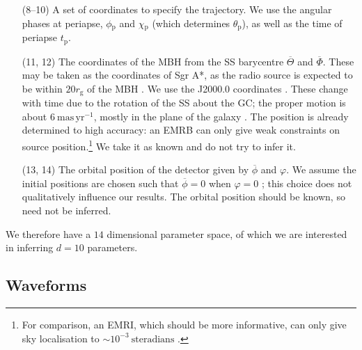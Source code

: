 \documentclass[useAMS,usedcolumn,usegraphicx,usenatbib]{mn2e}
\newcommand{\units}[1]{\ensuremath{~\mathrm{#1}}}
\newcommand{\sub}[1]{\ensuremath{_\mathrm{#1}}}
\begin{document}
\begin{enumerate}
\item[(8--10)] A set of coordinates to specify the trajectory. We use the angular phases at periapse, $\phi\sub{p}$ and $\chi\sub{p}$ (which determines $\theta\sub{p}$), as well as the time of periapse $t\sub{p}$.
\item[(11, 12)] The coordinates of the MBH from the SS barycentre $\overline{\Theta}$ and $\overline{\Phi}$. These may be taken as the coordinates of Sgr A*, as the radio source is expected to be within $20 r\sub{g}$ of the MBH \citep{Reid2003,Doeleman2008}. We use the J2000.0 coordinates \citep{Reid1999, Yusef-Zadeh1999}. These change with time due to the rotation of the SS about the GC; the proper motion is about $6\units{mas\,yr^{-1}}$, mostly in the plane of the galaxy \citep{Backer1999, Reid2003}. The position is already determined to high accuracy: an EMRB can only give weak constraints on source position.\footnote{For comparison, an EMRI, which should be more informative, can only give sky localisation to $\sim10^{-3}~\mathrm{steradians}$ \citep{Barack2004, Huerta2009}.} We take it as known and do not try to infer it.
\item[(13, 14)] The orbital position of the detector given by $\overline{\phi}$ and $\varphi$. We assume the initial positions are chosen such that $\overline{\phi} = 0$ when $\varphi = 0$ \citep{Cutler1998}; this choice does not qualitatively influence our results. The orbital position should be known, so need not be inferred.\\
\end{enumerate}
We therefore have a $14$ dimensional parameter space, of which we are interested in inferring $d = 10$ parameters.

\subsection{Waveforms}
\end{document}
